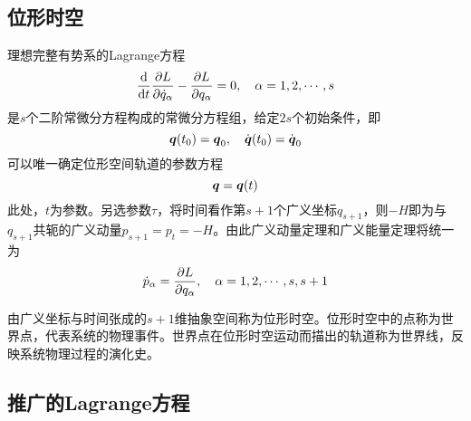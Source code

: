 \subsection{位形时空}

理想完整有势系的Lagrange方程
\begin{equation}
	\frac{\mathrm{d}}{\mathrm{d} t} \frac{\partial L}{\partial \dot{q}_\alpha} - \frac{\partial L}{\partial q_\alpha} = 0,\quad \alpha = 1,2,\cdots,s
\end{equation}
是$s$个二阶常微分方程构成的常微分方程组，给定$2s$个初始条件，即
\begin{equation*}
	\boldsymbol{q}(t_0) = \boldsymbol{q}_0,\quad \dot{\boldsymbol{q}}(t_0) = \dot{\boldsymbol{q}}_0
\end{equation*}
可以唯一确定位形空间轨道的参数方程
\begin{equation*}
	\boldsymbol{q} = \boldsymbol{q}(t)
\end{equation*}
此处，$t$为参数。另选参数$\tau$，将时间看作第$s+1$个广义坐标$q_{s+1}$，则$-H$即为与$q_{s+1}$共轭的广义动量$p_{s+1} = p_t = -H$。由此广义动量定理和广义能量定理将统一为
\begin{equation*}
	\dot{p}_\alpha = \frac{\partial L}{\partial q_\alpha},\quad \alpha = 1,2,\cdots,s,s+1
\end{equation*}

由广义坐标与时间张成的$s+1$维抽象空间称为{\heiti 位形时空}。位形时空中的点称为{\heiti 世界点}，代表系统的物理事件。世界点在位形时空运动而描出的轨道称为{\heiti 世界线}，反映系统物理过程的演化史。

\subsection{推广的Lagrange方程}

